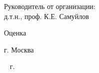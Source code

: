 \begin{titlepage}
\begin{minipage}{.45\textwidth}
    Руководитель от организации:\\
    д.т.н., проф. К.Е. Самуйлов
    
  \end{minipage}%
  \hfill
  
   
\vfill
Оценка \underline{\hspace{3cm}}

\centering
г. Москва

\
 г.
\end{titlepage}
